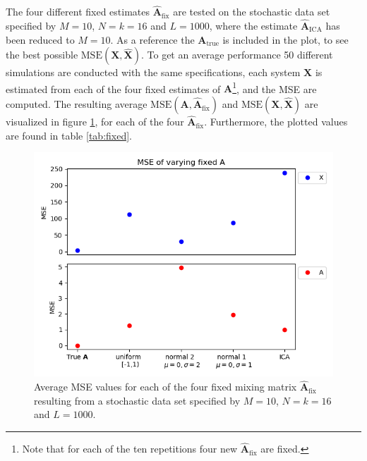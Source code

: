 The four different fixed estimates $\hat{\mathbf{A}}_{\text{fix}}$ are tested on the stochastic data set specified by $M = 10$, $N = k = 16$ and $L = 1000$, where the estimate $\hat{\mathbf{A}}_{\text{ICA}}$ has been reduced to $M = 10$. 
As a reference the $\mathbf{A}_{\text{true}}$ is included in the plot, to see the best possible $\text{MSE}(\mathbf{X}, \hat{\mathbf{X}})$.
To get an average performance 50 different simulations are conducted with the same specifications, each system $\mathbf{X}$ is estimated from each of the four fixed estimates of $\mathbf{A}$\footnote{Note that for each of the ten repetitions four new $\hat{\mathbf{A}}_{\text{fix}}$ are fixed.}, and the MSE are computed. 
The resulting average $\text{MSE}(\mathbf{A}, \hat{\mathbf{A}}_{\text{fix}})$ and $\text{MSE}(\mathbf{X}, \hat{\mathbf{X}})$ are visualized in figure \ref{fig:vary_A}, for each of the four $\hat{\mathbf{A}}_{\text{fix}}$. 
Furthermore, the plotted values are found in table \ref{tab:fixed}.
\begin{figure}[H]
\centering
\includegraphics[scale=0.5]{figures/ch_6/A_fix1.png}
\caption{Average MSE values for each of the four fixed mixing matrix $\hat{\mathbf{A}}_{\text{fix}}$ resulting from a stochastic data set specified by $M = 10$, $N = k = 16$ and $L = 1000$.}
\label{fig:vary_A}
\end{figure}
\noindent

